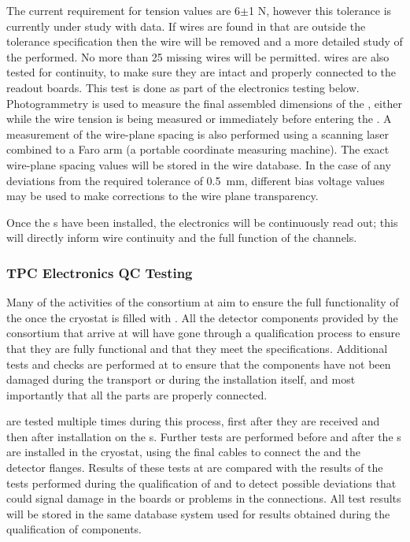 The current requirement for tension values are 6$\pm$1 N, however this tolerance is currently under study with  data.  
If wires are found in  that are outside the tolerance specification then the wire will be removed and a more detailed study of the  performed. 
No more than 25 missing wires will be permitted. 
 wires are also tested for continuity, to make sure they are intact and properly connected to the readout boards.
This test is done as part of the  electronics testing below. 
Photogrammetry is used to measure the final assembled dimensions of the , either while the wire tension is being measured or immediately before entering the \coldbox. A measurement of the wire-plane spacing is also performed using a scanning laser combined to a Faro arm (a portable coordinate measuring machine). The exact wire-plane spacing values will be stored in the wire  database.  In the case of  
any deviations from the required tolerance of \SI{0.5}{mm}, different bias voltage values may be used to make corrections to the wire plane transparency. 

Once the s have been installed, the  electronics will be continuously read out;  this will directly inform wire continuity and the full function of the channels. 

\subsubsection{TPC Electronics QC Testing}

Many of the activities of the  consortium at  aim to ensure the full functionality of the  once the cryostat is filled with . 
All the detector components provided by the  consortium that arrive at  will have gone through a qualification process to ensure that they are fully functional and that they meet the  specifications. 
Additional tests and checks are performed at 
to ensure that the components have not
been damaged during the transport or during the installation itself,
and most importantly that all the parts are properly connected.

 are tested multiple times during this process,  
first after they are received and then 
after 
installation on the s. Further 
tests are performed before and after the 
s are installed in the cryostat, using the final cables to connect the  and the detector flanges. 
Results of these tests at  are compared with the results of the
tests performed during the qualification of  and
 to detect possible deviations that could signal 
damage in the boards or problems in the connections. All test 
results will be stored in the same database system used for
results obtained during the qualification of components.

